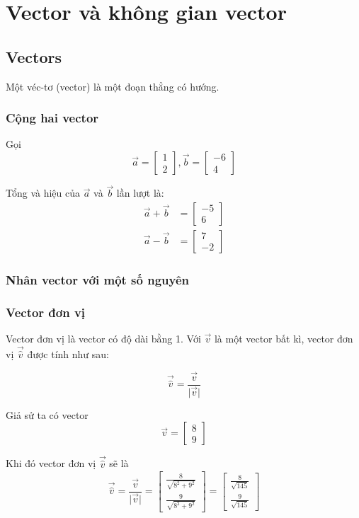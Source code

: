 \chapter{Vector và không gian vector}
\section{Vectors}
Một véc-tơ (vector) là một đoạn thẳng có hướng.

\subsection{Cộng hai vector}
Gọi
$$
\vec{a} = \begin{bmatrix}
1 \\
2
\end{bmatrix}, \vec{b} = \begin{bmatrix}
-6 \\
4
\end{bmatrix}
$$

Tổng và hiệu của $\vec{a}$ và $\vec{b}$ lần lượt là:
$$
\begin{aligned}
\vec{a} + \vec{b} &= \begin{bmatrix}
-5 \\
6
\end{bmatrix}\\
\vec{a} - \vec{b} &= \begin{bmatrix}
7 \\
-2
\end{bmatrix}
\end{aligned}
$$

\subsection{Nhân vector với một số nguyên}
\subsection{Vector đơn vị}
Vector đơn vị là vector có độ dài bằng 1. Với $\vec{v}$ là một vector bất kì, vector đơn vị $\vec{\hat{v}}$ được tính như sau:

$$
\vec{\hat{v}} = \frac{\vec{v}}{\lvert\vec{v}\rvert}
$$

Giả sử ta có vector
$$
\vec{v} = \begin{bmatrix}
8\\
9
\end{bmatrix}
$$

Khi đó vector đơn vị $\vec{\hat{v}}$ sẽ là
$$
\vec{\hat{v}} = \frac{\vec{v}}{\lvert\vec{v}\rvert} = \begin{bmatrix}
	\frac{8}{\sqrt{8^2 + 9^2}}\\
	\frac{9}{\sqrt{8^2 + 9^2}}
\end{bmatrix} = \begin{bmatrix}
\frac{8}{\sqrt{145}}\\
\frac{9}{\sqrt{145}}
\end{bmatrix}
$$
